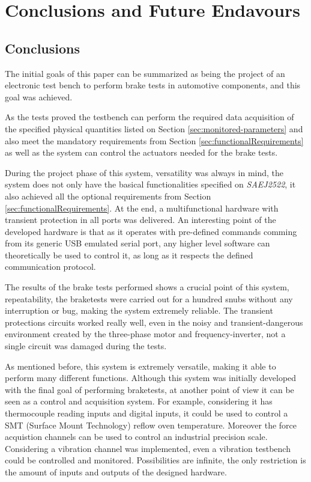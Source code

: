 \chapter{Conclusions and Future Endavours}\label{ch:conclusions-and-future-endavours}
	
	\section{Conclusions}\label{sec:conclusions}
		The initial goals of this paper can be summarized as being the project of an electronic test bench to perform brake tests in automotive components, and this goal was achieved.
		\par
		As the tests proved the testbench can perform the required data acquisition of the specified physical quantities listed on Section \ref{sec:monitored-parameters} and also meet the mandatory requirements from Section \ref{sec:functionalRequirements} as well as the system can control the actuators needed for the brake tests.
		\par
		During the project phase of this system, versatility was always in mind, the system does not only have the basical functionalities specified on \textit{SAEJ2522}, it also achieved all the optional requirements from Section \ref{sec:functionalRequirements}. At the end, a multifunctional hardware with transient protection in all ports was delivered. An interesting point of the developed hardware is that as it operates with pre-defined commands comming from its generic USB emulated serial port, any higher level software can theoretically be used to control it, as long as it respects the defined communication protocol.
		\par
		The results of the brake tests performed shows a crucial point of this system, repeatability, the braketests were carried out for a hundred snubs without any interruption or bug, making the system extremely reliable. The transient protections circuits worked really well, even in the noisy and transient-dangerous environment created by the three-phase motor and frequency-inverter, not a single circuit was damaged during the tests.
		\par
		As mentioned before, this system is extremely versatile, making it able to perform many different functions. Although this system was initially developed with the final goal of performing braketests, at another point of view it can be seen as a control and acquisition system. For example, considering it has thermocouple reading inputs and digital inputs, it could be used to control a SMT (Surface Mount Technology)  reflow oven temperature. Moreover the force acquistion channels can be used to control an industrial precision scale. Considering a vibration channel was implemented, even a vibration testbench could be controlled and monitored. Possibilities are infinite, the only restriction is the amount of inputs and outputs of the designed hardware.


